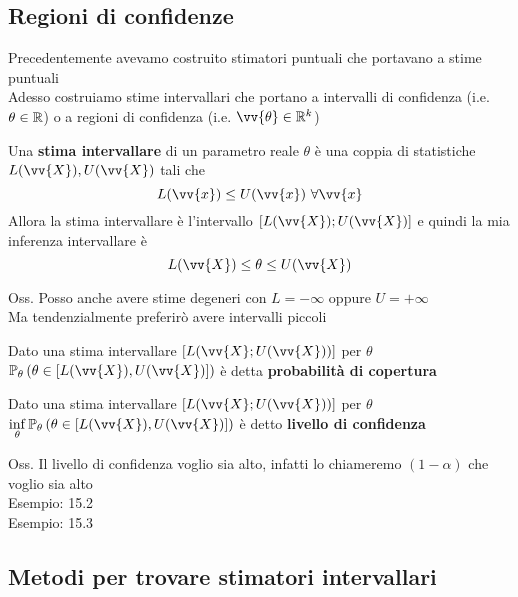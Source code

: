 \subsection{Regioni di confidenze}

Precedentemente avevamo costruito stimatori puntuali che portavano a stime puntuali\\
Adesso costruiamo stime intervallari che portano a intervalli di confidenza (i.e. $\theta\in \mathbb R$) o a regioni di confidenza (i.e. $\vv{\theta}\in \R^k$)\\


\begin{defi}
    Una \textbf{stima intervallare} di un parametro reale $\theta$ è una coppia di statistiche \ \ $L(\vv{X}), U(\vv{X})$ tali che
    \[L(\vv{x}) \le U(\vv{x}) \ \forall \vv{x}\]
    Allora la stima intervallare è l'intervallo $[L(\vv{X}); U(\vv{X})]$ e quindi la mia inferenza intervallare è \[L(\vv{X})\le \theta \le U(\vv{X})\]
\end{defi}


Oss. Posso anche avere stime degeneri con $L=-\infty$ oppure $U=+\infty$\\
Ma tendenzialmente preferirò avere intervalli piccoli\\ 


\begin{defi}
    Dato una stima intervallare $[L(\vv{X}; U(\vv{X}))]$ per $\theta$\\
    $\PP_{\theta}\O\theta\in [L(\vv{X}), U(\vv{X})]\C$ è detta \textbf{probabilità di copertura}
\end{defi}

\begin{defi}
    Dato una stima intervallare $[L(\vv{X}; U(\vv{X}))]$ per $\theta$\\
    $\displaystyle\inf_{\theta} \PP_{\theta}\O\theta \in [L(\vv{X}), U(\vv{X})]\C$ è detto \textbf{livello di confidenza}
\end{defi}

Oss. Il livello di confidenza voglio sia alto, infatti lo chiameremo $(1-\alpha)$ che voglio sia alto\\


Esempio: 15.2\\


Esempio: 15.3\\



\subsection{Metodi per trovare stimatori intervallari}

